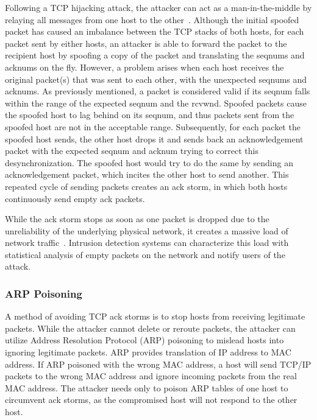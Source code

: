 \documentclass{sig-alternate}
\begin{document}
Following a TCP hijacking attack, the attacker can act as a man-in-the-middle by relaying all messages from one host to the other~\cite{joncheray:1995, gregg:stackhack}.
Although the initial spoofed packet has caused an imbalance between the TCP stacks of both hosts, for each packet sent by either hosts, an attacker is able to forward the packet to the recipient host by spoofing a copy of the packet and translating the seqnums and acknums on the fly.
However, a problem arises when each host receives the original packet(s) that was sent to each other, with the unexpected seqnums and acknums.
As previously mentioned, a packet is considered valid if its seqnum falls within the range of the expected seqnum and the rcvwnd.
Spoofed packets cause the spoofed host to lag behind on its seqnum, and thus packets sent from the spoofed host are not in the acceptable range.
Subsequently, for each packet the spoofed host sends, the other host drops it and sends back an acknowledgement packet with the expected seqnum and acknum trying to correct this desynchronization.
The spoofed host would try to do the same by sending an acknowledgement packet, which incites the other host to send another.
This repeated cycle of sending packets creates an ack storm, in which both hosts continuously send empty ack packets.

While the ack storm stops as soon as one packet is dropped due to the unreliability of the underlying physical network, it creates a massive load of network traffic~\cite{joncheray:1995}.
Intrusion detection systems can characterize this load with statistical analysis of empty packets on the network and notify users of the attack.

\subsubsection{ARP Poisoning}

A method of avoiding TCP ack storms is to stop hosts from receiving legitimate packets.
While the attacker cannot delete or reroute packets, the attacker can utilize Address Resolution Protocol (ARP) poisoning to mislead hosts into ignoring legitimate packets.
ARP provides translation of IP address to MAC address.
If ARP poisoned with the wrong MAC address, a host will send TCP/IP packets to the wrong MAC address and ignore incoming packets from the real MAC address.
The attacker needs only to poison ARP tables of one host to circumvent ack storms, as the compromised host will not respond to the other host.
\end{document}
